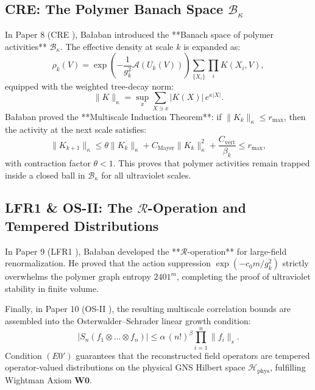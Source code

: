 \subsection{CRE: The Polymer Banach Space $\mathcal{B}_\kappa$}
\label{subsec:cre_summary}

In Paper 8 (CRE \cite{Balaban1988b}), Ba\l aban introduced the **Banach space of polymer activities** $\mathcal{B}_\kappa$. The effective density at scale $k$ is expanded as:
\begin{equation}
\label{eq:ch12_polymer_expansion_density}
\rho_k(V) = \exp\left( -\frac{1}{g_k^2} \mathcal{A}(U_k(V)) \right) \sum_{\{X_i\}} \prod_i K(X_i, V),
\end{equation}
equipped with the weighted tree-decay norm:
\begin{equation}
\label{eq:ch12_tree_decay_norm}
\|K\|_\kappa = \sup_{x} \sum_{X \ni x} |K(X)| \, e^{\kappa |X|}.
\end{equation}
Ba\l aban proved the **Multiscale Induction Theorem**: if $\|K_k\|_\kappa \le r_{\max}$, then the activity at the next scale satisfies:
\begin{equation}
\label{eq:ch12_activity_induction}
\|K_{k+1}\|_\kappa \le \theta \|K_k\|_\kappa + C_{\mathrm{Mayer}} \|K_k\|_\kappa^2 + \frac{C_{\mathrm{vert}}}{\beta_k} \le r_{\max},
\end{equation}
with contraction factor $\theta < 1$. This proves that polymer activities remain trapped inside a closed ball in $\mathcal{B}_\kappa$ for all ultraviolet scales.

\subsection{LFR1 \& OS-II: The $\mathcal{R}$-Operation and Tempered Distributions}
\label{subsec:lfr1_os2_summary}

In Paper 9 (LFR1 \cite{Balaban1989}), Ba\l aban developed the **$\mathcal{R}$-operation** for large-field renormalization. He proved that the action suppression $\exp(-c_0 m / g_k^2)$ strictly overwhelms the polymer graph entropy $2401^m$, completing the proof of ultraviolet stability in finite volume.

Finally, in Paper 10 (OS-II \cite{OsterwalderSchrader1975}), the resulting multiscale correlation bounds are assembled into the Osterwalder--Schrader linear growth condition:
\begin{equation}
\label{eq:ch12_os2_linear_growth}
\left| S_n(f_1 \otimes \dots \otimes f_n) \right| \le \alpha \, (n!)^\beta \prod_{i=1}^n \|f_i\|_s.
\end{equation}
Condition $(E0')$ guarantees that the reconstructed field operators are tempered operator-valued distributions on the physical GNS Hilbert space $\mathcal{H}_{\mathrm{phys}}$, fulfilling Wightman Axiom $\mathbf{W0}$.

